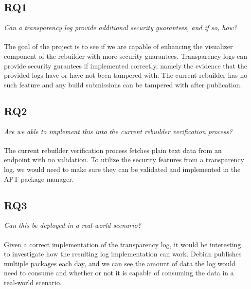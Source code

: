 \documentclass[../Main/thesis.tex]{subfiles}
\begin{document}
\subsection*{RQ1}%
\label{sub:rq1}
\textit{Can a transparency log provide additional security guarantees, and if so, how?}
\\\\
The goal of the project is to see if we are capable of enhancing the visualizer
component of the rebuilder with more security guarantees. Transparency logs can
provide security gurantees if implemented correctly, namely the evidence that
the provided logs have or have not been tampered with. The current rebuilder
has no such feature and any build submissions can be tampered with after
publication.

\subsection*{RQ2}%
\label{sub:rq2}
\textit{Are we able to implement this into the current rebuilder verification process?}
\\\\
The current rebuilder verification process fetches plain text data from an
endpoint with no validation. To utilize the security features from a
transparency log, we would need to make sure they can be validated and
implemented in the APT package manager.

\subsection*{RQ3}%
\label{sub:rq3}
\textit{Can this be deployed in a real-world scenario?}
\\\\
Given a correct implementation of the transparency log, it would be interesting
to investigate how the resulting log implementation can work. Debian publishes
multiple packages each day, and we can see the amount of data the log would need
to consume and whether or not it is capable of consuming the data in a
real-world scenario.

\blankpage
\end{document}
